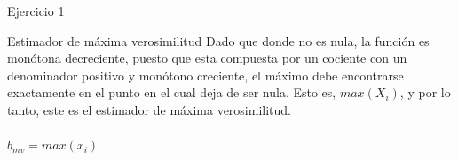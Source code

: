 \begin{section}{Ejercicio 1}
\begin{subsection}{Estimador de máxima verosimilitud}
Dado que donde no es nula, la función es monótona decreciente, puesto que esta compuesta por un cociente con un denominador positivo y monótono creciente, el máximo debe encontrarse exactamente en el punto en el cual deja de ser nula. Esto es, $max(X_i)$, y por lo tanto, este es el estimador de máxima verosimilitud.\\
~\\

$\hat{b}_{mv} = max(x_i)$
~\\

\end{subsection}


\end{section}


